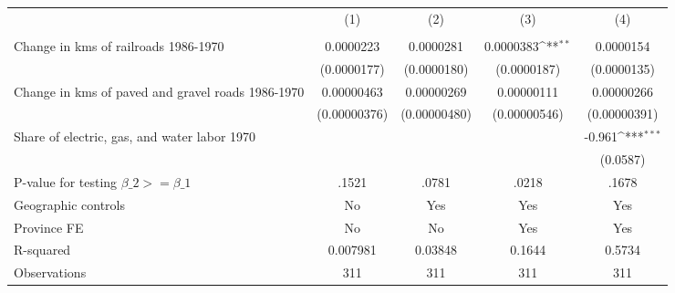 {
\def\sym#1{\ifmmode^{#1}\else\(^{#1}\)\fi}
\begin{tabular}{l*{4}{c}}
\hline\hline
                &\multicolumn{1}{c}{(1)}&\multicolumn{1}{c}{(2)}&\multicolumn{1}{c}{(3)}&\multicolumn{1}{c}{(4)}\\
                &\multicolumn{1}{c}{}&\multicolumn{1}{c}{}&\multicolumn{1}{c}{}&\multicolumn{1}{c}{}\\
\hline
Change in kms of railroads 1986-1970&0.0000223         &0.0000281         &0.0000383\sym{**} &0.0000154         \\
                &(0.0000177)         &(0.0000180)         &(0.0000187)         &(0.0000135)         \\
[1em]
Change in kms of paved and gravel roads 1986-1970&0.00000463         &0.00000269         &0.00000111         &0.00000266         \\
                &(0.00000376)         &(0.00000480)         &(0.00000546)         &(0.00000391)         \\
[1em]
Share of electric, gas, and water labor 1970&                  &                  &                  &   -0.961\sym{***}\\
                &                  &                  &                  & (0.0587)         \\
\hline
P-value for testing $\beta\_{2} >= \beta\_{1}$&    .1521         &    .0781         &    .0218         &    .1678         \\
Geographic controls&       No         &      Yes         &      Yes         &      Yes         \\
Province FE     &       No         &       No         &      Yes         &      Yes         \\
R-squared       & 0.007981         &  0.03848         &   0.1644         &   0.5734         \\
Observations    &      311         &      311         &      311         &      311         \\
\hline\hline
\end{tabular}
}
